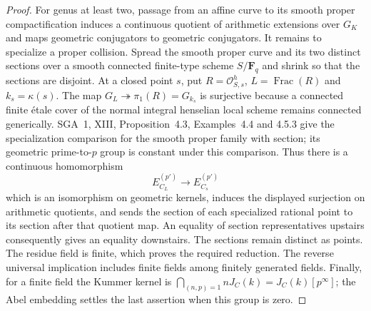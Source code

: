 \documentclass[11pt]{article}
\begin{document}
\begin{proof}
For genus at least two, passage from an affine curve to its smooth
proper compactification induces a continuous quotient of arithmetic
extensions over $G_K$ and maps geometric conjugators to geometric
conjugators.  It remains to specialize a proper collision.  Spread the
smooth proper curve and its two distinct sections over a smooth
connected finite-type scheme $S/\mathbf F_q$ and shrink so that the
sections are disjoint.  At a closed point $s$, put
$R=\mathcal O_{S,s}^{h}$, $L=\operatorname{Frac}(R)$ and
$k_s=\kappa(s)$.  The map $G_L\twoheadrightarrow\pi_1(R)=G_{k_s}$ is
surjective because a connected finite \'etale cover of the normal
integral henselian local scheme remains connected generically.
SGA~1, XIII, Proposition~4.3, Examples~4.4 and 4.5.3 give the
specialization comparison for the smooth proper family with section;
its geometric prime-to-$p$ group is constant under this comparison.
Thus there is a continuous homomorphism
\[
 E_{C_L}^{(p')}\longrightarrow E_{C_s}^{(p')}
\]
which is an isomorphism on geometric kernels, induces the displayed
surjection on arithmetic quotients, and sends the section of each
specialized rational point to its section after that quotient map.
An equality of section representatives upstairs consequently gives an
equality downstairs.  The sections remain distinct as points.  The
residue field is finite, which proves the required reduction.  The
reverse universal implication includes finite fields among finitely
generated fields.  Finally, for a finite field the Kummer kernel is
$\bigcap_{(n,p)=1}nJ_C(k)=J_C(k)[p^\infty]$; the Abel embedding
settles the last assertion when this group is zero.
\end{proof}
\end{document}
